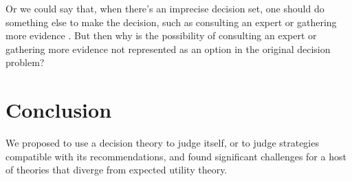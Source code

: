 \documentclass[a4paper]{article}
\newcommand\U{\mathfrak{U}} %
\newcommand{\todoold}[2][]{\todo[backgroundcolor=white,bordercolor=orange!10,linecolor=gray!10, #1,caption={},textcolor=gray]{Pre-rev: #2}}
\newcommand{\todooldinfo}[2][]{\todoold[#1]{#2}}
\renewcommand{\color}[1]{}
\newenvironment{colored}[1]{\leavevmode\color{#1}}{}
\newcommand\SetDelimiter[1][]{
	\nonscript\,#1\vert \allowbreak \nonscript\,\mathopen{}}
\providecommand\given{\SetDelimiter}
\newenvironment{CCM rewritten}
{\begingroup\color{blue}} %
{\endgroup}              %
\begin{document}
Or we could say that, when there's an imprecise decision set, one should do something else to make the decision, such as consulting an expert or gathering more evidence \citep{de2014efficient}. But then why is the possibility of consulting an expert or gathering more evidence not represented as an option in the original decision problem?




%
%
%
%
%



\section{Conclusion}


We proposed to use a decision theory to judge itself, or to judge strategies compatible with its recommendations, and found significant challenges for a host of theories that diverge from expected utility theory. 
\end{document}
